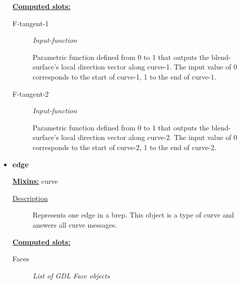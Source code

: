 \documentclass [11pt]{book}
\begin{document}
\begin{itemize}
\begin{figure}
\end{figure}





\textbf{
\underline{Computed slots:}}

\begin{description}

\item [F-tangent-1]
\emph{Input-function}

 Parametric function defined from 0 to 1 that outputs the blend-surface's local direction vector along curve-1. The input value of 0 corresponds to the start of curve-1, 1 to the end of curve-1.




\item [F-tangent-2]
\emph{Input-function}

 Parametric function defined from 0 to 1 that outputs the blend-surface's local direction vector along curve-2. The input value of 0 corresponds to the start of curve-2, 1 to the end of curve-2.




\end{description}







\item {}
\label{prim:edge}
\textbf{edge}


\textbf{
\underline{Mixins:}} curve





\begin{description}

\item [
\underline{Description}]


Represents one edge in a brep. This object is a type of curve and answers all curve messages.



\end{description}








\textbf{
\underline{Computed slots:}}

\begin{description}

\item [Faces]
\emph{List of GDL Face objects}


\end{description}
\end{itemize}
\end{document}
